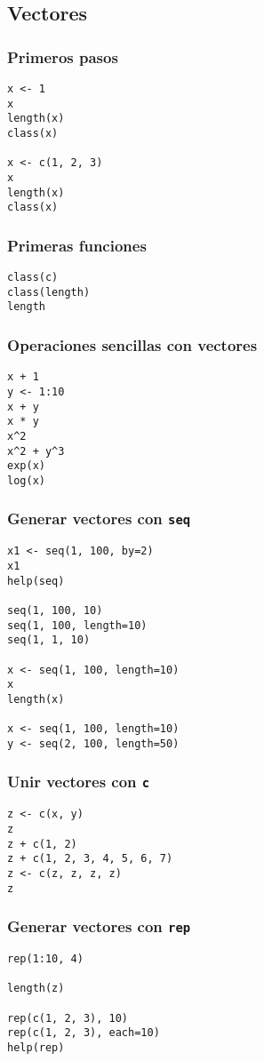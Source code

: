 \documentclass[xcolor={usenames,svgnames,dvipsnames}]{beamer}
\begin{document}
\subsection{Vectores}
\label{sec-2-1}
\begin{frame}[fragile]
\frametitle{Primeros pasos}
\label{sec-2-1-1}


\lstset{language=R}
\begin{lstlisting}
x <- 1
x
length(x)
class(x)

x <- c(1, 2, 3)
x
length(x)
class(x)
\end{lstlisting}
\end{frame}
\begin{frame}[fragile]
\frametitle{Primeras funciones}
\label{sec-2-1-2}


\lstset{language=R}
\begin{lstlisting}
class(c)
class(length)
length
\end{lstlisting}
\end{frame}
\begin{frame}[fragile]
\frametitle{Operaciones sencillas con vectores}
\label{sec-2-1-3}


\lstset{language=R}
\begin{lstlisting}
x + 1
y <- 1:10
x + y
x * y
x^2
x^2 + y^3
exp(x)
log(x)
\end{lstlisting}
\end{frame}
\begin{frame}[fragile]
\frametitle{Generar vectores con \texttt{seq}}
\label{sec-2-1-4}


\lstset{language=R}
\begin{lstlisting}
x1 <- seq(1, 100, by=2)
x1
help(seq)

seq(1, 100, 10)
seq(1, 100, length=10)
seq(1, 1, 10)

x <- seq(1, 100, length=10)
x
length(x)

x <- seq(1, 100, length=10)
y <- seq(2, 100, length=50)
\end{lstlisting}
\end{frame}
\begin{frame}[fragile]
\frametitle{Unir vectores con \texttt{c}}
\label{sec-2-1-5}


\lstset{language=R}
\begin{lstlisting}
z <- c(x, y)
z
z + c(1, 2)
z + c(1, 2, 3, 4, 5, 6, 7)
z <- c(z, z, z, z)
z
\end{lstlisting}
\end{frame}
\begin{frame}[fragile]
\frametitle{Generar vectores con \texttt{rep}}
\label{sec-2-1-6}


\lstset{language=R}
\begin{lstlisting}
rep(1:10, 4)

length(z)

rep(c(1, 2, 3), 10)
rep(c(1, 2, 3), each=10)
help(rep)
\end{lstlisting}
\end{frame}
\end{document}

